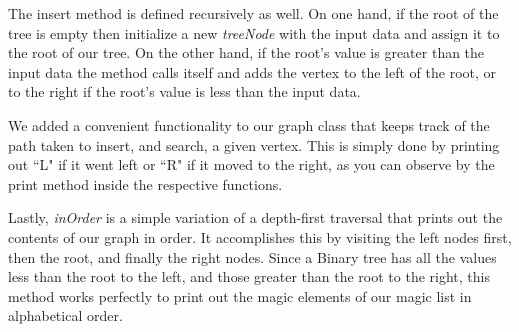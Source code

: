 \documentclass[letterpaper, 10pt]{article}
\begin{document}
The insert method is defined recursively as well. On one hand, if the root of the tree is empty then initialize a new \textit{treeNode} with the input data and assign it to the root of our tree. On the other hand, if the root's value is greater than the input data the method calls itself and adds the vertex to the left of the root, or to the right if the root's value is less than the input data. 

We added a convenient functionality to our graph class that keeps track of the path taken to insert, and search, a given vertex. This is simply done by printing out ``L" if it went left or ``R" if it moved to the right, as you can observe by the print method inside the respective functions.

Lastly, \textit{inOrder} is a simple variation of a depth-first traversal that prints out the contents of our graph in order. It accomplishes this by visiting the left nodes first, then the root, and finally the right nodes. Since a Binary tree has all the values less than the root to the left, and those greater than the root to the right, this method works perfectly to print out the magic elements of our magic list in alphabetical order.
\\
\end{document}
